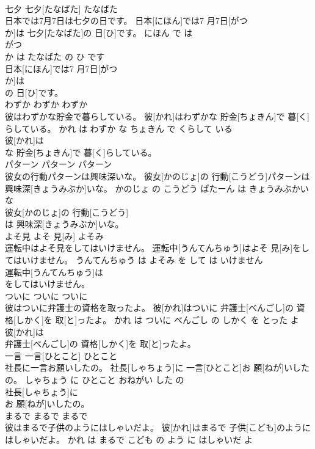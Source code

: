 \documentclass[8pt]{extreport}
\begin{document}
\begin{CJK}{UTF8}{min}
\\	七夕	七夕[たなばた]	たなばた	
\\	日本では7月7日は七夕の日です。	日本[にほん]では7 月7日[がつ 
\\	か]は 七夕[たなばた]の 日[ひ]です。	にほん で は 
\\	がつ 
\\	か は たなばた の ひ です	
\\	日本[にほん]では7 月7日[がつ 
\\	か]は
\\	の 日[ひ]です。			
\\	わずか	わずか	わずか	
\\	彼はわずかな貯金で暮らしている。	彼[かれ]はわずかな 貯金[ちょきん]で 暮[く]らしている。	かれ は わずか な ちょきん で くらして いる	
\\	彼[かれ]は
\\	な 貯金[ちょきん]で 暮[く]らしている。			
\\	パターン	パターン	パターン	
\\	彼女の行動パターンは興味深いな。	彼女[かのじょ]の 行動[こうどう]パターンは 興味深[きょうみぶか]いな。	かのじょ の こうどう ぱたーん は きょうみぶかい な	
\\	彼女[かのじょ]の 行動[こうどう]
\\	は 興味深[きょうみぶか]いな。			
\\	よそ見	よそ 見[み]	よそみ	
\\	運転中はよそ見をしてはいけません。	運転中[うんてんちゅう]はよそ 見[み]をしてはいけません。	うんてんちゅう は よそみ を して は いけません	
\\	運転中[うんてんちゅう]は
\\	をしてはいけません。			
\\	ついに	ついに	ついに	
\\	彼はついに弁護士の資格を取ったよ。	彼[かれ]はついに 弁護士[べんごし]の 資格[しかく]を 取[と]ったよ。	かれ は ついに べんごし の しかく を とった よ	
\\	彼[かれ]は
\\	弁護士[べんごし]の 資格[しかく]を 取[と]ったよ。			
\\	一言	一言[ひとこと]	ひとこと	
\\	社長に一言お願いしたの。	社長[しゃちょう]に 一言[ひとこと]お 願[ねが]いしたの。	しゃちょう に ひとこと おねがい した の	
\\	社長[しゃちょう]に
\\	お 願[ねが]いしたの。			
\\	まるで	まるで	まるで	
\\	彼はまるで子供のようにはしゃいだよ。	彼[かれ]はまるで 子供[こども]のようにはしゃいだよ。	かれ は まるで こども の よう に はしゃいだ よ	

\end{CJK}
\end{document}
